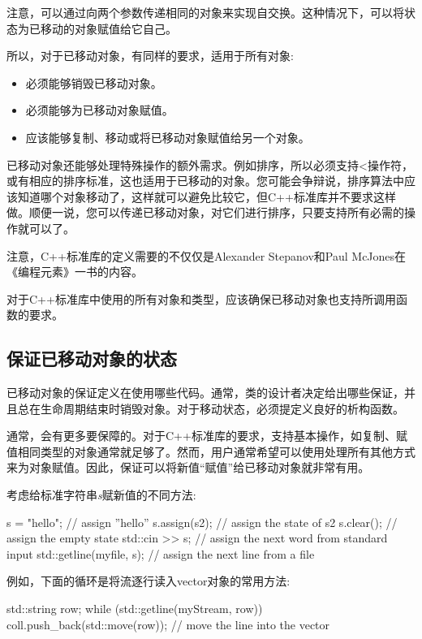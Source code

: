注意，可以通过向两个参数传递相同的对象来实现自交换。这种情况下，可以将状态为已移动的对象赋值给它自己。

所以，对于已移动对象，有同样的要求，适用于所有对象:

\begin{itemize}
	\item 必须能够销毁已移动对象。
	\item 必须能够为已移动对象赋值。
	\item 应该能够复制、移动或将已移动对象赋值给另一个对象。
\end{itemize}

已移动对象还能够处理特殊操作的额外需求。例如排序，所以必须支持<操作符，或有相应的排序标准，这也适用于已移动的对象。您可能会争辩说，排序算法中应该知道哪个对象移动了，这样就可以避免比较它，但C++标准库并不要求这样做。顺便一说，您可以传递已移动对象，对它们进行排序，只要支持所有必需的操作就可以了。

注意，C++标准库的定义需要的不仅仅是Alexander Stepanov和Paul McJones在《编程元素》一书的内容。

对于C++标准库中使用的所有对象和类型，应该确保已移动对象也支持所调用函数的要求。

\subsection{保证已移动对象的状态}

已移动对象的保证定义在使用哪些代码。通常，类的设计者决定给出哪些保证，并且总在生命周期结束时销毁对象。对于移动状态，必须提定义良好的析构函数。

通常，会有更多要保障的。对于C++标准库的要求，支持基本操作，如复制、赋值相同类型的对象通常就足够了。然而，用户通常希望可以使用处理所有其他方式来为对象赋值。因此，保证可以将新值“赋值”给已移动对象就非常有用。

考虑给标准字符串\textit{s}赋新值的不同方法:

\begin{cppcode}
s = "hello"; // assign ”hello”
s.assign(s2); // assign the state of s2
s.clear(); // assign the empty state
std::cin >> s; // assign the next word from standard input
std::getline(myfile, s); // assign the next line from a file
\end{cppcode}

例如，下面的循环是将流逐行读入vector对象的常用方法:

\begin{cppcode}
std::string row;
while (std::getline(myStream, row)) {
	coll.push_back(std::move(row)); // move the line into the vector
}
\end{cppcode}

